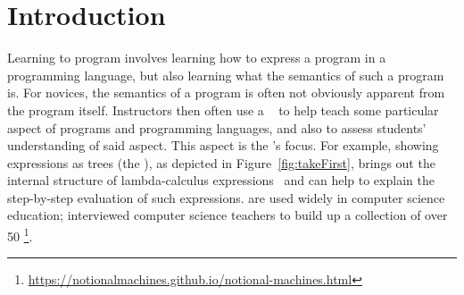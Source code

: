 \section{Introduction}

Learning to program involves learning how to express a program in a programming language, 
but also learning what the semantics of such a program is. 
For novices, the semantics of a program is often not obviously apparent from the program itself.
Instructors then often use a \emph{\nm{}}~\citep{fincherNotionalMachinesComputing2020} to help teach
some particular aspect of programs and programming languages,
and also to assess students' understanding of said aspect.
%
This aspect is the \nm{}'s focus.
%
For example, showing expressions as trees (the  \nm{}),
as depicted in Figure~\ref{fig:takeFirst},
brings out the internal structure of lambda-calculus expressions~\citep{marceauValuesGrowTrees2011}
and can help to explain the step-by-step evaluation of such expressions. 
%
\Nms{} are used widely in computer science education;
\citet{fincherNotionalMachinesComputing2020} interviewed computer science teachers
to build up a collection of over 50 \nms{}\footnote{\url{https://notionalmachines.github.io/notional-machines.html}}.

